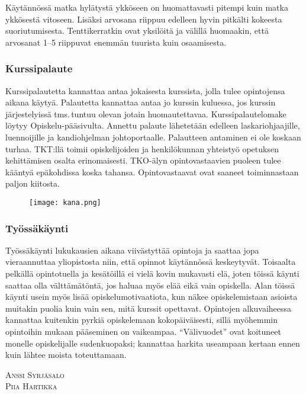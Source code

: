 \documentclass[../ala_hataile.tex]{subfiles}
\begin{document}
	Käytännössä matka hylätystä ykköseen
	on huomattavasti pitempi kuin matka ykkösestä
	vitoseen. Lisäksi arvosana riippuu
	edelleen hyvin pitkälti kokeesta suoriutumisesta.
	Tenttikerratkin ovat yksilöitä ja
	välillä huomaakin, että arvosanat 1--5 riippuvat
	enemmän tuurista kuin osaamisesta.
	
	\subsubsection*{Kurssipalaute}
	Kurssipalautetta kannattaa antaa jokaisesta
	kurssista, jolla tulee opintojensa aikana
	käytyä. Palautetta kannattaa antaa jo
	kurssin kuluessa, jos kurssin järjestelyissä
	tms.\,tuntuu olevan jotain huomautettavaa.
	Kurssipalautelomake löytyy
	Opiskelu-pääsivulta. Annettu palaute lähetetään
	edelleen laskariohjaajille, luennoijille
	ja kandiohjelman johtoportaalle. Palautteen
	antaminen ei ole koskaan turhaa. TKT:llä
	toimii opiskelijoiden ja henkilökunnan
	yhteistyö opetuksen kehittämisen
	osalta erinomaisesti. TKO-älyn opintovastaavien
	puoleen tulee kääntyä epäkohdissa
	koska tahansa. Opintovastaavat ovat saaneet
	toiminnastaan paljon kiitosta.
	\begin{figure}[b]
		\centering
		\texttt{[image: kana.png]}
	\end{figure}
	
	\subsubsection*{Työssäkäynti}
	Työssäkäynti lukukausien aikana viivästyttää
	opintoja ja saattaa jopa vieraannuttaa
	yliopistosta niin, että opinnot käytännössä
	keskeytyvät. Toisaalta pelkällä opintotuella
	ja kesätöillä ei vielä kovin mukavasti elä,
	joten töissä käynti saattaa olla välttämätöntä,
	jos haluaa myös elää eikä vain opiskella.
	Alan töissä käynti usein myös lisää opiskelumotivaatiota,
	kun näkee opiskelemistaan
	asioista muitakin puolia kuin vain sen, mitä
	kurssit opettavat. Opintojen alkuvaiheessa
	kannattaa kuitenkin pyrkiä opiskelemaan
	kokopäiväisesti, sillä myöhemmin opintoihin
	mukaan pääseminen on vaikeampaa. 
	``Välivuodet'' ovat koituneet monelle
	opiskelijalle sudenkuopaksi; kannattaa
	harkita useampaan kertaan ennen
	kuin lähtee moista toteuttamaan.
	
	\vspace{0.5cm}
	\noindent\textsc{Anssi Syrjäsalo}\\
	\textsc{Piia Hartikka}
	
	
\end{document}
